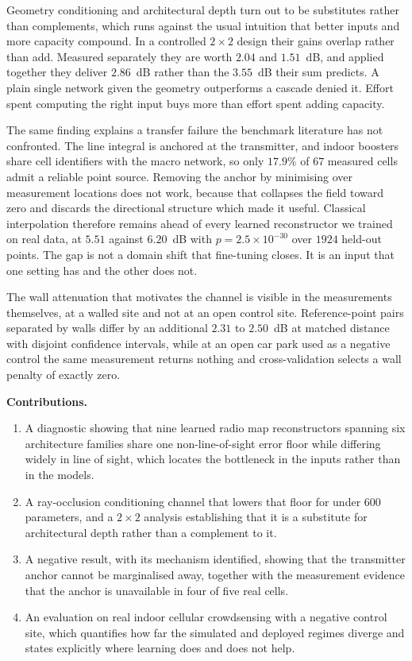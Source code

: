 Geometry conditioning and architectural depth turn out to be substitutes rather than
complements, which runs against the usual intuition that better inputs and more
capacity compound. In a controlled $2 \times 2$ design their gains overlap rather than
add. Measured separately they are worth $2.04$ and
$1.51$~dB, and applied together they deliver $2.86$~dB rather than the $3.55$~dB
their sum predicts. A plain single network given the geometry outperforms a cascade
denied it. Effort spent computing the right input buys more than effort spent adding
capacity.

The same finding explains a transfer failure the benchmark literature has not
confronted. The line integral is anchored at the transmitter, and indoor boosters
share cell identifiers with the macro network, so only $17.9\%$ of $67$ measured
cells admit a reliable point source. Removing the anchor by minimising over
measurement locations does not work, because that collapses the field toward zero and
discards the directional structure which made it useful. Classical interpolation
therefore remains ahead of every learned reconstructor we trained on real data, at
$5.51$ against $6.20$~dB with $p = 2.5 \times 10^{-30}$ over $1924$ held-out points.
The gap is not a domain shift that fine-tuning closes. It is an input that one
setting has and the other does not.

The wall attenuation that motivates the channel is visible in the measurements
themselves, at a walled site and not at an open control site. Reference-point pairs
separated by walls differ by an additional $2.31$ to $2.50$~dB at matched distance
with disjoint confidence intervals, while at an open car park used as a negative
control the same measurement returns nothing and cross-validation selects a wall
penalty of exactly zero.

\noindent\textbf{Contributions.}
\begin{enumerate}[itemsep=1pt,topsep=3pt,parsep=0pt,leftmargin=1.2em]
    \item A diagnostic showing that nine learned radio map reconstructors spanning
    six architecture families share one non-line-of-sight error floor while differing
    widely in line of sight, which locates the bottleneck in the inputs rather than
    in the models.
    \item A ray-occlusion conditioning channel that lowers that floor for under
    $600$ parameters, and a $2 \times 2$ analysis establishing that it is a substitute for
    architectural depth rather than a complement to it.
    \item A negative result, with its mechanism identified, showing that the
    transmitter anchor cannot be marginalised away, together with the measurement
    evidence that the anchor is unavailable in four of five real cells.
    \item An evaluation on real indoor cellular crowdsensing with a negative control
    site, which quantifies how far the simulated and deployed regimes diverge and
    states explicitly where learning does and does not help.
\end{enumerate}
